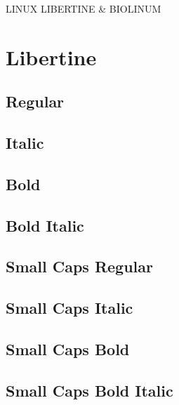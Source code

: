 \documentclass{article}
\begin{document}
\begin{center}\huge
{\libertineDisplay LINUX LIBERTINE \& BIOLINUM}
\end{center}

\tableofcontents

\section{Libertine}


\subsection*{Regular}
\lipsum[1]

\subsection*{Italic}
\textit{\lipsum[2]} 

\subsection*{Bold}
\textbf{\lipsum[3]}

\subsection*{Bold Italic}

\textbf{\textit{\lipsum[4]}}


\subsection*{Small Caps Regular}
\textsc{\lipsum[5]}

\subsection*{Small Caps Italic}
\textsc{\textit{\lipsum[6]}}

\subsection*{Small Caps Bold}
\textsc{\textbf{\lipsum[7]}}

\subsection*{Small Caps Bold Italic}

\textsc{\textbf{\textit{\lipsum[8]}}}
\end{document}
